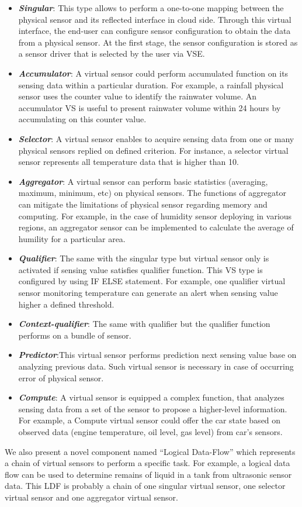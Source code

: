 \begin{itemize}
    \item \textbf{\textit{Singular}}: This type allows to perform a one-to-one mapping between the physical sensor and its reflected interface in cloud side. Through this virtual interface, the end-user can configure sensor configuration to obtain the data from a physical sensor. At the first stage, the sensor configuration is stored as a sensor driver that is selected by the user via VSE.
    \item \textbf{\textit{Accumulator}}: A virtual sensor could perform accumulated function on its sensing data within a particular duration. For example, a rainfall physical sensor uses the counter value to identify the rainwater volume. An accumulator VS is useful to present rainwater volume within 24 hours by accumulating on this counter value.
    \item \textbf{\textit{Selector}}: A virtual sensor enables to acquire sensing data from one or many physical sensors replied on defined criterion. For instance, a selector virtual sensor represents all temperature data that is higher than 10.
    \item \textbf{\textit{Aggregator}}: A virtual sensor can perform basic statistics (averaging, maximum, minimum, etc)  on physical sensors. The functions of aggregator can mitigate the limitations of physical sensor regarding memory and computing. For example, in the case of humidity sensor deploying in various regions, an aggregator sensor can be implemented to calculate the average of humility for a particular area.
    \item \textbf{\textit{Qualifier}}: The same with the singular type but virtual sensor only is activated if sensing value satisfies qualifier function. This VS type is configured by using IF ELSE statement. For example, one qualifier virtual sensor monitoring temperature can generate an alert when sensing value higher a defined threshold.
    \item \textbf{\textit{Context-qualifier}}: The same with qualifier but the qualifier function performs on a bundle of sensor.
    \item \textbf{\textit{Predictor}}:This virtual sensor performs prediction next sensing value base on analyzing previous data. Such virtual sensor is necessary in case of occurring error of physical sensor.
    \item \textbf{\textit{Compute}}: A virtual sensor is equipped a complex function, that analyzes sensing data from a set of the sensor to propose a higher-level information. For example, a Compute virtual sensor could offer the car state based on observed data (engine temperature, oil level, gas level) from car’s sensors.
\end{itemize}
We also present a novel component named “Logical Data-Flow” which represents a chain of virtual sensors to perform a specific task.  For example, a logical data flow can be used to determine remains of liquid in a tank from ultrasonic sensor data. This LDF is probably a chain of one singular virtual sensor, one selector virtual sensor and one aggregator virtual sensor.

